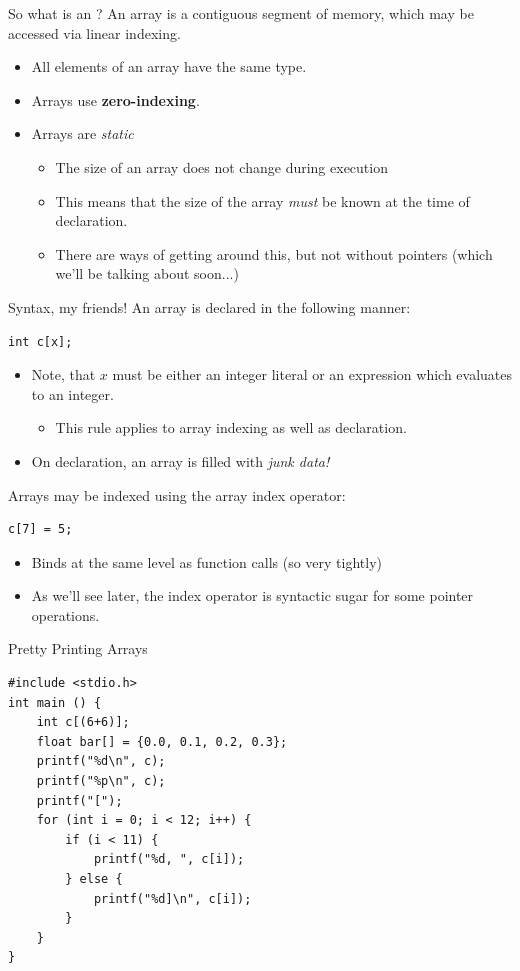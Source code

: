 \documentclass[11pt]{beamer}
\let\OldTexttt\texttt
\renewcommand{\texttt}[1]{\OldTexttt{\color{teal}{#1}}}
\begin{document}
\begin{frame}{So what is an \texttt{Array}?}
An array is a contiguous segment of memory, which may be accessed via linear indexing.
\begin{itemize}
\item All elements of an array have the same type.
\item Arrays use \textbf{zero-indexing}.
\item Arrays are \emph{static}
\begin{itemize}
\item The size of an array does not change during execution
\item This means that the size of the array \emph{must} be known at the time of declaration.  
\item There are ways of getting around this, but not without pointers (which we'll be talking about soon...)
\end{itemize}
\end{itemize}
\end{frame}

\begin{frame}[fragile=singleslide]{Syntax, my friends!}
An array is declared in the following manner:
\begin{lstlisting}[style=C]
int c[x];
\end{lstlisting}
\begin{itemize}
\item Note, that $x$ must be either an integer literal or an expression which evaluates to an integer. 
\begin{itemize}
\item This rule applies to array indexing as well as declaration.
\end{itemize} 
\item On declaration, an array is filled with \emph{junk data!}
\end{itemize}
Arrays may be indexed using the array index operator:
\begin{lstlisting}[style=C] 
c[7] = 5;
\end{lstlisting} 
\begin{itemize}
\item Binds at the same level as function calls (so very tightly)
\item As we'll see later, the index operator is syntactic sugar for some pointer operations.
\end{itemize}
\end{frame}

\begin{frame}[fragile=singleslide]{Pretty Printing Arrays}
\begin{lstlisting}[style=C] 
#include <stdio.h>
int main () {
	int c[(6+6)];
	float bar[] = {0.0, 0.1, 0.2, 0.3};
	printf("%d\n", c);
	printf("%p\n", c);
	printf("[");
	for (int i = 0; i < 12; i++) {
		if (i < 11) {
			printf("%d, ", c[i]);
		} else {
			printf("%d]\n", c[i]);
		}
	}
}
\end{lstlisting} 
\end{frame}
\end{document}
